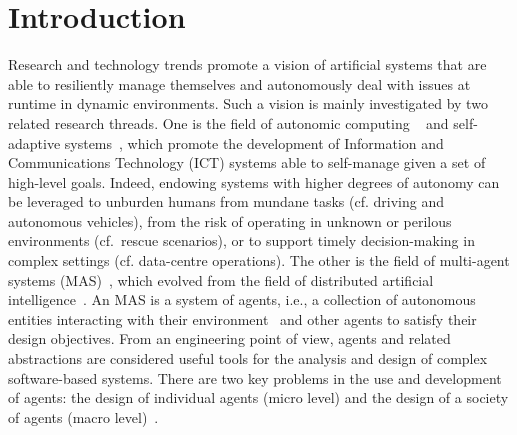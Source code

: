 \documentclass[jsan,article,accept,moreauthors,pdftex]{Definitions/mdpi}
\newcommand{\meta}[1]{{\color{blue}{#1}}}
\begin{document}


\section{Introduction}
\label{s:intro}


Research and technology trends 
 promote a vision of artificial systems
 that are able to resiliently manage themselves 
 and autonomously deal with issues at runtime
 in dynamic environments.
%
Such a vision is mainly investigated by two related research threads.
%
One is the field of {autonomic computing%
}~\citep{DBLP:journals/computer/KephartC03} and {self-adaptive systems}~\citep{lemos2010sweng-selfadaptive-2ndresearchroadmap},
 which promote the development of Information and Communications Technology (ICT) systems
 able to self-manage given a set of high-level goals.
%
Indeed, endowing systems with higher degrees of autonomy can be leveraged to
 unburden humans from mundane tasks (cf. driving and autonomous vehicles),
 from the risk of operating in unknown or perilous environments
 (\mbox{cf. rescue} scenarios),
 or to support timely decision-making in complex settings
 (cf. data-centre operations).
%
The other is the field of {multi-agent systems (MAS)}~\citep{wooldridge2009mas}, which evolved from the field of {distributed artificial intelligence}~\cite{ferber1999mas-dai}.
%
An MAS is a system of {agents}, i.e., a collection of {autonomous} entities interacting with their {environment}~\citep{DBLP:journals/aamas/WeynsOO07} and other agents to satisfy their design objectives.
%
From an engineering point of view, agents and related abstractions are considered useful tools for the analysis
and design of complex software-based systems.
%
There are two key problems in the use and development of agents: the design of individual agents ({micro level}) and the design of a {society} of agents ({macro level})~\citep{wooldridge2009mas}.
\end{document}
